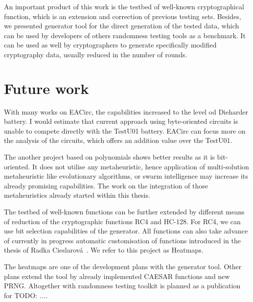 \documentclass[
  print, %
  Table,   %
  nolof,     %
  nolot,     %
  11pt, %
  oneside  %
]{fithesis3}
\newcommand{\todo}[1]{TODO: \textit{#1}}
\begin{document}
An important product of this work is the testbed of well-known cryptographical function, which is an extension and correction of previous testing sets. Besides, we presented generator tool for the direct generation of the tested data, which can be used by developers of others randomness testing tools as a benchmark. It can be used as well by cryptographers to generate specifically modified cryptography data, usually reduced in the number of rounds.

\section{Future work}
\label{sec:conclusion-future}

With many works on EACirc, the capabilities increased to the level od Dieharder battery. I would estimate that current approach using byte-oriented circuits is unable to compete directly with the TestU01 battery. EACirc can focus more on the analysis of the circuits, which offers an addition value over the TestU01.

The another project based on polynomials shows better results as it is bit-oriented. It does not utilise any metaheuristic, hence application of multi-solution metaheuristic like evolutionary algorithms, or swarm intelligence may increase its already promising capabilities. The work on the integration of those metaheuristics already started within this thesis.

The testbed of well-known functions can be further extended by different means of reduction of the cryptographic functions RC4 and HC-128. For RC4, we can use bit selection capabilities of the generator. All functions can also take advance of currently in progress automatic customisation of functions introduced in the thesis of Radka Cieslarová~\cite{cieslarovaBcThesis}. We refer to this project as Heatmaps.

The heatmaps are one of the development plans with the generator tool. Other plans extend the tool by already implemented CAESAR functions and new PRNG. Altogether with randomness testing toolkit is planned as a publication for \todo{...}.

\end{document}
